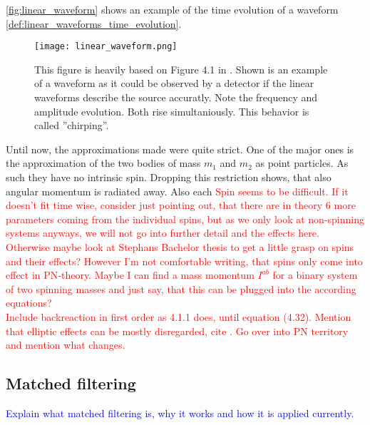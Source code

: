 \autoref{fig:linear_waveform} shows an example of the time evolution of a waveform \eqref{def:linear_waveforms_time_evolution}.\medskip\\
\begin{figure}
\centering
\texttt{[image: linear\_waveform.png]}
\caption[Example time-evolution of a linear waveform]{This figure is heavily based on Figure 4.1 in \cite{gwv1}. Shown is an example of a waveform as it could be observed by a detector if the linear waveforms describe the source accuratly. Note the frequency and amplitude evolution. Both rise simultaniously. This behavior is called ''chirping''.}\label{fig:linear_waveform}
\end{figure}
Until now, the approximations made were quite strict. One of the major ones is the approximation of the two bodies of mass $m_1$ and $m_2$ as point particles. As such they have no intrinsic spin. Dropping this restriction shows, that also angular momentum is radiated away. Also each \textcolor{red}{Spin seems to be difficult. If it doesn't fit time wise, consider just pointing out, that there are in theory 6 more parameters coming from the individual spins, but as we only look at non-spinning systems anyways, we will not go into further detail and the effects here. Otherwise maybe look at Stephans Bachelor thesis to get a little grasp on spins and their effects? However I'm not comfortable writing, that spins only come into effect in PN-theory. Maybe I can find a mass momentum $I^{ab}$ for a binary system of two spinning masses and just say, that this can be plugged into the according equations?}\\
\textcolor{red}{Include backreaction in first order as 4.1.1 \cite{gwv1} does, until equation (4.32). Mention that elliptic effects can be mostly disregarded, cite \cite{gwv1}. Go over into PN territory and mention what changes.}

\subsection{Matched filtering}
\textcolor{blue}{Explain what matched filtering is, why it works and how it is applied currently.}